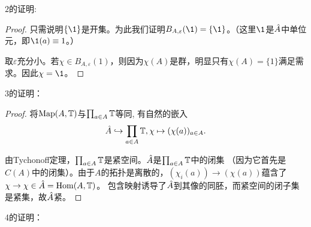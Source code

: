 $2$的证明: 
\begin{proof}
    只需说明$\{\1\}$是开集。为此我们证明$B_{A,\varepsilon}(\1) = \{\1\}$。（这里$\1$是$\hat{A}$中单位元，即$\1(a) \equiv 1$。）

    取$\varepsilon$充分小。若$\chi \in B_{A,\varepsilon}(1)$，则因为$\chi(A)$是群，明显只有$\chi(A) = \{1\}$满足需求。因此$\chi = \1$。
\end{proof}
$3$的证明：
\begin{proof}
    将$\operatorname{Map}(A,\mathbb{T})$与$\prod_{a \in A} \mathbb{T}$等同, 有自然的嵌入
\[\hat{A} \hookrightarrow \prod_{a \in A} \mathbb{T}, \chi \mapsto (\chi(a))_{a \in A}.\]

由Tychonoff定理，$\prod_{a \in A} \mathbb{T}$是紧空间。$\hat{A}$是$\prod_{a \in A} \mathbb{T}$中的闭集
（因为它首先是$C(A)$中的闭集）。由于$A$的拓扑是离散的，$(\chi_i(a)) \to (\chi(a))$蕴含了$\chi \to \chi \in \hat{A} = \operatorname{Hom}(A,\mathbb{T})$。
包含映射诱导了$\hat{A}$到其像的同胚，而紧空间的闭子集是紧集，故$\hat{A}$紧。
\end{proof}
4的证明：
